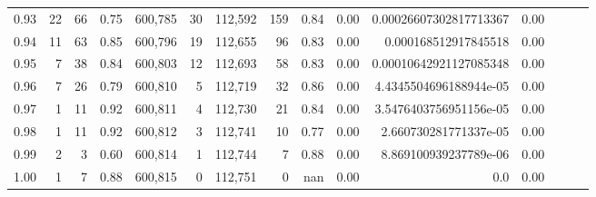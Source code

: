 \begin{tabular}{rrrrrrrrrrrrrrr}
0.93 &      22 &     66 &  0.75 &  600,785 &       30 &  112,592 &      159 &  0.84 &  0.00 &  0.00026607302817713367 &      0.00 \\
0.94 &      11 &     63 &  0.85 &  600,796 &       19 &  112,655 &       96 &  0.83 &  0.00 &    0.000168512917845518 &      0.00 \\
0.95 &       7 &     38 &  0.84 &  600,803 &       12 &  112,693 &       58 &  0.83 &  0.00 &  0.00010642921127085348 &      0.00 \\
0.96 &       7 &     26 &  0.79 &  600,810 &        5 &  112,719 &       32 &  0.86 &  0.00 &  4.4345504696188944e-05 &      0.00 \\
0.97 &       1 &     11 &  0.92 &  600,811 &        4 &  112,730 &       21 &  0.84 &  0.00 &  3.5476403756951156e-05 &      0.00 \\
0.98 &       1 &     11 &  0.92 &  600,812 &        3 &  112,741 &       10 &  0.77 &  0.00 &   2.660730281771337e-05 &      0.00 \\
0.99 &       2 &      3 &  0.60 &  600,814 &        1 &  112,744 &        7 &  0.88 &  0.00 &   8.869100939237789e-06 &      0.00 \\
1.00 &       1 &      7 &  0.88 &  600,815 &        0 &  112,751 &        0 &   nan &  0.00 &                     0.0 &      0.00 \\
\bottomrule
\end{tabular}
